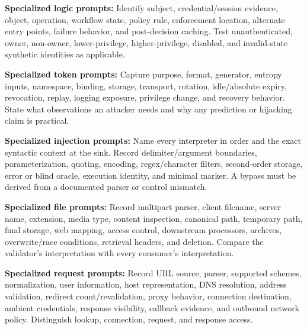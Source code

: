 \documentclass[11pt]{article}
\begin{document}
\begin{tcolorbox}[breakable,title=Template 2 --- Authentication or authorization logic review,colback=Mist,colframe=Teal]
\analysisrecord
\textbf{Specialized logic prompts:} Identify subject, credential/session evidence,
object, operation, workflow state, policy rule, enforcement location, alternate
entry points, failure behavior, and post-decision caching. Test unauthenticated,
owner, non-owner, lower-privilege, higher-privilege, disabled, and invalid-state
synthetic identities as applicable.
\end{tcolorbox}

\begin{tcolorbox}[breakable,title=Template 3 --- Session and token analysis,colback=Mist,colframe=Teal]
\analysisrecord
\textbf{Specialized token prompts:} Capture purpose, format, generator, entropy
inputs, namespace, binding, storage, transport, rotation, idle/absolute expiry,
revocation, replay, logging exposure, privilege change, and recovery behavior.
State what observations an attacker needs and why any prediction or hijacking
claim is practical.
\end{tcolorbox}

\begin{tcolorbox}[breakable,title=Template 4 --- Injection analysis,colback=Mist,colframe=Teal]
\analysisrecord
\textbf{Specialized injection prompts:} Name every interpreter in order and the
exact syntactic context at the sink. Record delimiter/argument boundaries,
parameterization, quoting, encoding, regex/character filters, second-order
storage, error or blind oracle, execution identity, and minimal marker. A bypass
must be derived from a documented parser or control mismatch.
\end{tcolorbox}

\begin{tcolorbox}[breakable,title=Template 5 --- File upload and handling analysis,colback=Mist,colframe=Teal]
\analysisrecord
\textbf{Specialized file prompts:} Record multipart parser, client filename,
server name, extension, media type, content inspection, canonical path, temporary
path, final storage, web mapping, access control, downstream processors, archives,
overwrite/race conditions, retrieval headers, and deletion. Compare the validator's
interpretation with every consumer's interpretation.
\end{tcolorbox}

\begin{tcolorbox}[breakable,title=Template 6 --- SSRF analysis,colback=Mist,colframe=Teal]
\analysisrecord
\textbf{Specialized request prompts:} Record URL source, parser, supported schemes,
normalization, user information, host representation, DNS resolution, address
validation, redirect count/revalidation, proxy behavior, connection destination,
ambient credentials, response visibility, callback evidence, and outbound network
policy. Distinguish lookup, connection, request, and response access.
\end{tcolorbox}
\end{document}
